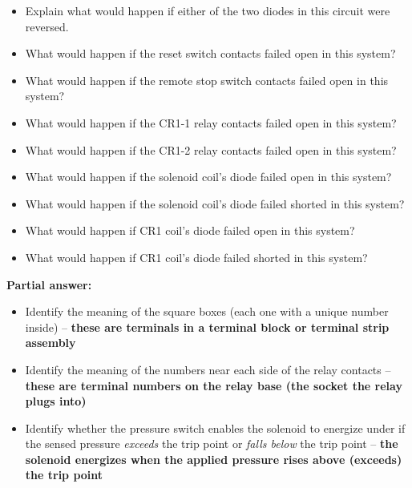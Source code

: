 \begin{itemize}
\item{} Explain what would happen if either of the two diodes in this circuit were reversed.
\item{} What would happen if the reset switch contacts failed open in this system?
\item{} What would happen if the remote stop switch contacts failed open in this system?
\item{} What would happen if the CR1-1 relay contacts failed open in this system?
\item{} What would happen if the CR1-2 relay contacts failed open in this system?
\item{} What would happen if the solenoid coil's diode failed open in this system?
\item{} What would happen if the solenoid coil's diode failed shorted in this system?
\item{} What would happen if CR1 coil's diode failed open in this system?
\item{} What would happen if CR1 coil's diode failed shorted in this system?
\end{itemize}






\noindent
{\bf Partial answer:}

\begin{itemize}
\item{} Identify the meaning of the square boxes (each one with a unique number inside) -- {\bf these are terminals in a terminal block or terminal strip assembly}
\vskip 10pt
\item{} Identify the meaning of the numbers near each side of the relay contacts -- {\bf these are terminal numbers on the relay base (the socket the relay plugs into)}
\vskip 10pt
\item{} Identify whether the pressure switch enables the solenoid to energize under if the sensed pressure {\it exceeds} the trip point or {\it falls below} the trip point -- {\bf the solenoid energizes when the applied pressure rises above (exceeds) the trip point}
\end{itemize}








